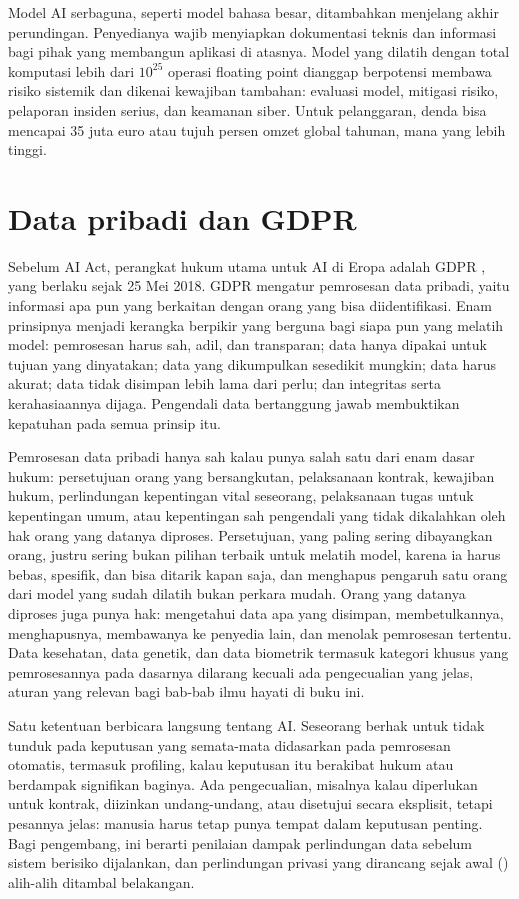 Model AI serbaguna, seperti model bahasa besar, ditambahkan menjelang akhir perundingan. Penyedianya
wajib menyiapkan dokumentasi teknis dan informasi bagi pihak yang membangun aplikasi di atasnya. Model
yang dilatih dengan total komputasi lebih dari $10^{25}$ operasi floating point dianggap berpotensi
membawa risiko sistemik dan dikenai kewajiban tambahan: evaluasi model, mitigasi risiko, pelaporan
insiden serius, dan keamanan siber. Untuk pelanggaran, denda bisa mencapai 35 juta euro atau tujuh persen
omzet global tahunan, mana yang lebih tinggi.

\section{Data pribadi dan GDPR}

Sebelum AI Act, perangkat hukum utama untuk AI di Eropa adalah GDPR \citep{gdpr2016}, yang berlaku sejak
25 Mei 2018. GDPR mengatur pemrosesan data pribadi, yaitu informasi apa pun yang berkaitan dengan orang
yang bisa diidentifikasi. Enam prinsipnya menjadi kerangka berpikir yang berguna bagi siapa pun yang
melatih model: pemrosesan harus sah, adil, dan transparan; data hanya dipakai untuk tujuan yang
dinyatakan; data yang dikumpulkan sesedikit mungkin; data harus akurat; data tidak disimpan lebih lama
dari perlu; dan integritas serta kerahasiaannya dijaga. Pengendali data bertanggung jawab membuktikan
kepatuhan pada semua prinsip itu.

Pemrosesan data pribadi hanya sah kalau punya salah satu dari enam dasar hukum: persetujuan orang yang bersangkutan,
pelaksanaan kontrak, kewajiban hukum, perlindungan kepentingan vital seseorang, pelaksanaan tugas untuk kepentingan umum,
atau kepentingan sah pengendali yang tidak dikalahkan oleh hak orang yang datanya diproses. Persetujuan, yang paling sering
dibayangkan orang, justru sering bukan pilihan terbaik untuk melatih model, karena ia harus bebas, spesifik, dan bisa
ditarik kapan saja, dan menghapus pengaruh satu orang dari model yang sudah dilatih bukan perkara mudah. Orang yang datanya
diproses juga punya hak: mengetahui data apa yang disimpan, membetulkannya, menghapusnya, membawanya ke penyedia lain, dan
menolak pemrosesan tertentu. Data kesehatan, data genetik, dan data biometrik termasuk kategori khusus yang pemrosesannya
pada dasarnya dilarang kecuali ada pengecualian yang jelas, aturan yang relevan bagi bab-bab ilmu hayati di buku ini.

Satu ketentuan berbicara langsung tentang AI. Seseorang berhak untuk tidak tunduk pada keputusan yang
semata-mata didasarkan pada pemrosesan otomatis, termasuk profiling, kalau keputusan itu berakibat
hukum atau berdampak signifikan baginya. Ada pengecualian, misalnya kalau diperlukan untuk kontrak,
diizinkan undang-undang, atau disetujui secara eksplisit, tetapi pesannya jelas: manusia harus tetap
punya tempat dalam keputusan penting. Bagi pengembang, ini berarti penilaian dampak perlindungan data
sebelum sistem berisiko dijalankan, dan perlindungan privasi yang dirancang sejak awal () alih-alih ditambal belakangan.

